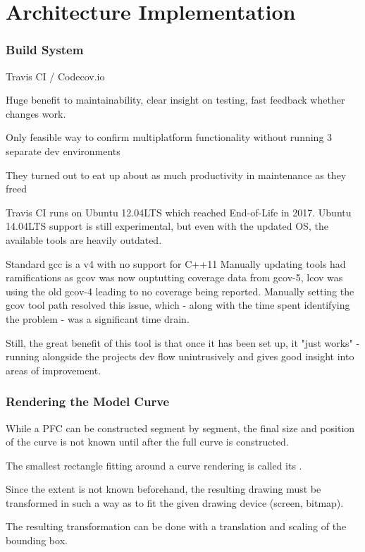 \chapter{Architecture Implementation}

\subsection{Build System}
Travis CI / Codecov.io

Huge benefit to maintainability, clear insight on testing, fast feedback whether changes work.

Only feasible way to confirm multiplatform functionality without running 3 separate dev environments

They turned out to eat up about as much productivity in maintenance as they freed

Travis CI runs on Ubuntu 12.04LTS which reached End-of-Life in 2017. Ubuntu 14.04LTS support is still experimental, but even with the updated OS, the available tools are heavily outdated.

Standard gcc is a v4 with no support for C++11
Manually updating tools had ramifications as gcov was now ouptutting coverage data from gcov-5, lcov was using the old gcov-4 leading to no coverage being reported. Manually setting the gcov tool path resolved this issue, which - along with the time spent identifying the problem - was a significant time drain.

Still, the great benefit of this tool is that once it has been set up, it "just works" - running alongside the projects dev flow unintrusively and gives good insight into areas of improvement.

\subsection{Rendering the Model Curve}
While a PFC can be constructed segment by segment, the final size and position of the curve is not known until after the full curve is constructed.

The smallest rectangle fitting around a curve rendering is called its .

Since the extent is not known beforehand, the resulting drawing must be transformed in such a way as to fit the given drawing device (screen, bitmap).

The resulting transformation can be done with a translation and scaling of the bounding box.

